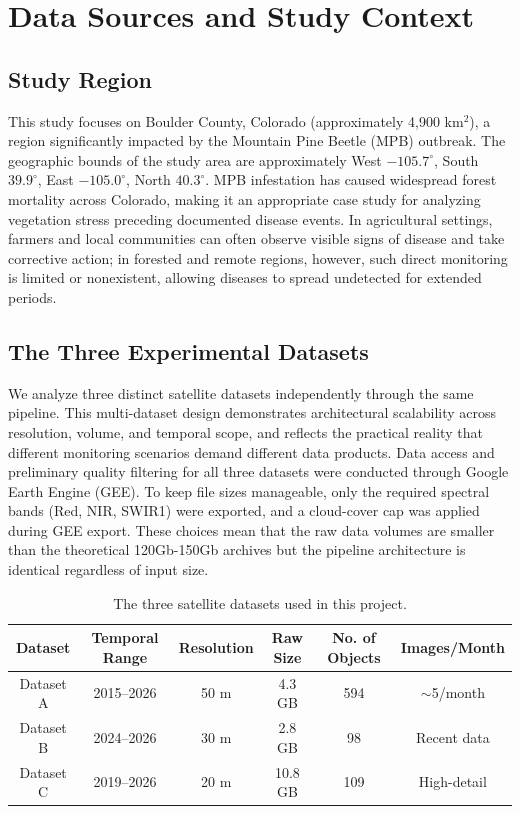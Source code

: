 \section{Data Sources and Study Context}

\subsection{Study Region}

This study focuses on Boulder County, Colorado (approximately 4,900 km$^2$), a region significantly impacted by the Mountain Pine Beetle (MPB) outbreak. The geographic bounds of the study area are approximately West $-105.7^\circ$, South $39.9^\circ$, East $-105.0^\circ$, North $40.3^\circ$. MPB infestation has caused widespread forest mortality across Colorado, making it an appropriate case study for analyzing vegetation stress preceding documented disease events. In agricultural settings, farmers and local communities can often observe visible signs of disease and take corrective action; in forested and remote regions, however, such direct monitoring is limited or nonexistent, allowing diseases to spread undetected for extended periods.

\subsection{The Three Experimental Datasets}

We analyze three distinct satellite datasets independently through the same pipeline. This multi-dataset design demonstrates architectural scalability across resolution, volume, and temporal scope, and reflects the practical reality that different monitoring scenarios demand different data products. Data access and preliminary quality filtering for all three datasets were conducted through Google Earth Engine (GEE). To keep file sizes manageable, only the required spectral bands (Red, NIR, SWIR1) were exported, and a cloud-cover cap was applied during GEE export. These choices mean that the raw data volumes are smaller than the theoretical 120Gb-150Gb archives but the pipeline architecture is identical regardless of input size.

\begin{table}[H]
\centering
\begin{tabular}{|c|c|c|c|c|c|}
\hline
\textbf{Dataset} & \textbf{Temporal Range} & \textbf{Resolution} & \textbf{Raw Size} & \textbf{No. of Objects} & \textbf{Images/Month} \\
\hline
Dataset A & 2015--2026 & 50 m & 4.3 GB & 594 & $\sim$5/month \\
\hline
Dataset B & 2024--2026 & 30 m & 2.8 GB & 98 & Recent data \\
\hline
Dataset C & 2019--2026 & 20 m & 10.8 GB & 109 & High-detail \\
\hline
\end{tabular}
\caption{The three satellite datasets used in this project.}
\label{tab:datasets}
\end{table}

